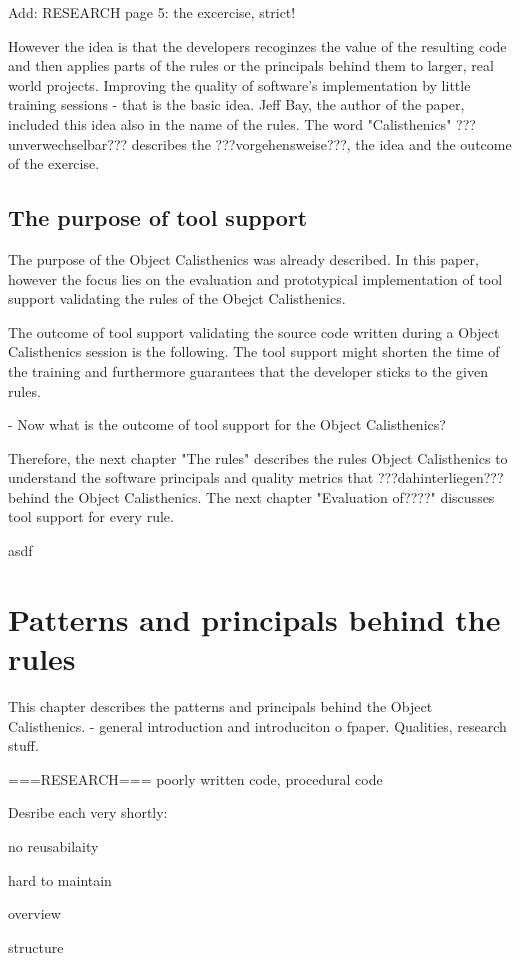 Add: RESEARCH page 5: the excercise, strict!

However the idea is that the developers recoginzes the value of the resulting code and then applies parts of the rules or the principals behind them to larger, real world projects. 
Improving the quality of software's implementation by little training sessions - that is the basic idea. Jeff Bay, the author of the paper, included this idea also in the name of the rules. The word "Calisthenics" ???unverwechselbar??? describes the ???vorgehensweise???, the idea and the outcome of the exercise.

\section{The purpose of tool support}
The purpose of the Object Calisthenics was already described. In this paper, however the focus lies on the evaluation and prototypical implementation of tool support validating the rules of the Obejct Calisthenics. 

The outcome of tool support validating the source code written during a Object Calisthenics session is the following. The tool support might shorten the time of the training and furthermore guarantees that the developer sticks to the given rules. 

- Now what is the outcome of tool support for the Object Calisthenics?

Therefore, the next chapter  "The rules" describes the rules Object Calisthenics to understand the software principals and quality metrics that ???dahinterliegen??? behind the Object Calisthenics. 
The next chapter "Evaluation of????" discusses tool support for every rule. 

asdf

\chapter{Patterns and principals behind the rules}
This chapter describes the patterns and principals behind the Object Calisthenics. 
- general introduction and introduciton o fpaper. Qualities, research stuff.

===RESEARCH===
poorly written code, procedural code

Desribe each very shortly: 

no reusabilaity

hard to maintain

overview

structure

